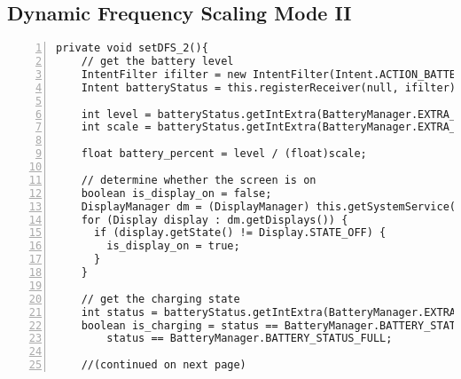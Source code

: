 \documentclass{article} %
\begin{document}
\subsection{Dynamic Frequency Scaling Mode II}
\begin{lstlisting}[float=*,caption={Dynamic Frequency Scaling Mode II},label={lst:DFS_2},numbers=left]
  private void setDFS_2(){
    // get the battery level
    IntentFilter ifilter = new IntentFilter(Intent.ACTION_BATTERY_CHANGED);
    Intent batteryStatus = this.registerReceiver(null, ifilter);

    int level = batteryStatus.getIntExtra(BatteryManager.EXTRA_LEVEL, -1);
    int scale = batteryStatus.getIntExtra(BatteryManager.EXTRA_SCALE, -1);

    float battery_percent = level / (float)scale;

    // determine whether the screen is on
    boolean is_display_on = false;
    DisplayManager dm = (DisplayManager) this.getSystemService(Context.DISPLAY_SERVICE);
    for (Display display : dm.getDisplays()) {
      if (display.getState() != Display.STATE_OFF) {
        is_display_on = true;
      }
    }

    // get the charging state
    int status = batteryStatus.getIntExtra(BatteryManager.EXTRA_STATUS, -1);
    boolean is_charging = status == BatteryManager.BATTERY_STATUS_CHARGING ||
        status == BatteryManager.BATTERY_STATUS_FULL;

    //(continued on next page)    
\end{lstlisting}
\end{document}
